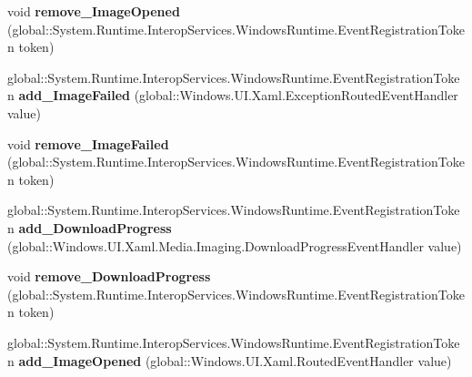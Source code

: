 \begin{DoxyCompactItemize}
void {\bfseries remove\+\_\+\+Image\+Opened} (global\+::\+System.\+Runtime.\+Interop\+Services.\+Windows\+Runtime.\+Event\+Registration\+Token token)
\item 
\mbox{\label{interface_windows_1_1_u_i_1_1_xaml_1_1_media_1_1_imaging_1_1_i_bitmap_image_a6aa4435d5ae45040075c92c78e19dabb}} 
global\+::\+System.\+Runtime.\+Interop\+Services.\+Windows\+Runtime.\+Event\+Registration\+Token {\bfseries add\+\_\+\+Image\+Failed} (global\+::\+Windows.\+U\+I.\+Xaml.\+Exception\+Routed\+Event\+Handler value)
\item 
\mbox{\label{interface_windows_1_1_u_i_1_1_xaml_1_1_media_1_1_imaging_1_1_i_bitmap_image_ab77fcc8961126a071f77bee1dc55bcc6}} 
void {\bfseries remove\+\_\+\+Image\+Failed} (global\+::\+System.\+Runtime.\+Interop\+Services.\+Windows\+Runtime.\+Event\+Registration\+Token token)
\item 
\mbox{\label{interface_windows_1_1_u_i_1_1_xaml_1_1_media_1_1_imaging_1_1_i_bitmap_image_a81353ece4edf0af8840923994b02b772}} 
global\+::\+System.\+Runtime.\+Interop\+Services.\+Windows\+Runtime.\+Event\+Registration\+Token {\bfseries add\+\_\+\+Download\+Progress} (global\+::\+Windows.\+U\+I.\+Xaml.\+Media.\+Imaging.\+Download\+Progress\+Event\+Handler value)
\item 
\mbox{\label{interface_windows_1_1_u_i_1_1_xaml_1_1_media_1_1_imaging_1_1_i_bitmap_image_ab600f3019a91621d8000a9cdc22141e7}} 
void {\bfseries remove\+\_\+\+Download\+Progress} (global\+::\+System.\+Runtime.\+Interop\+Services.\+Windows\+Runtime.\+Event\+Registration\+Token token)
\item 
\mbox{\label{interface_windows_1_1_u_i_1_1_xaml_1_1_media_1_1_imaging_1_1_i_bitmap_image_a0a0af7713d2dfccf2cd37b15f1f121ea}} 
global\+::\+System.\+Runtime.\+Interop\+Services.\+Windows\+Runtime.\+Event\+Registration\+Token {\bfseries add\+\_\+\+Image\+Opened} (global\+::\+Windows.\+U\+I.\+Xaml.\+Routed\+Event\+Handler value)
\item 

\end{DoxyCompactItemize}
